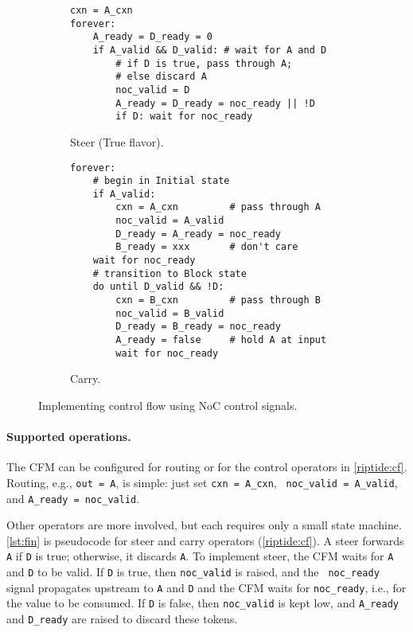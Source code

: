 \begin{figure}[t]
\begin{subfigure}{\linewidth}
\begin{lstlisting}[style=custompython]
cxn = A_cxn
forever:
    A_ready = D_ready = 0
    if A_valid && D_valid: # wait for A and D
        # if D is true, pass through A;
        # else discard A 
        noc_valid = D
        A_ready = D_ready = noc_ready || !D
        if D: wait for noc_ready
\end{lstlisting}
\caption{Steer (True flavor).}
\label{lst:fin:steer}
\end{subfigure}

\begin{subfigure}{\linewidth}
\begin{lstlisting}[style=custompython]
forever:
    # begin in Initial state
    if A_valid:
        cxn = A_cxn         # pass through A
        noc_valid = A_valid
        D_ready = A_ready = noc_ready
        B_ready = xxx       # don't care
    wait for noc_ready
    # transition to Block state
    do until D_valid && !D:
        cxn = B_cxn         # pass through B
        noc_valid = B_valid
        D_ready = B_ready = noc_ready
        A_ready = false     # hold A at input
        wait for noc_ready
\end{lstlisting}
\caption{Carry.}
\label{lst:fin:carry}
\end{subfigure}
  \caption{Implementing control flow using NoC control signals.}
  \label{lst:fin}
\end{figure}

\paragraph{Supported operations.}
The CFM can be configured for routing or for the control operators in
\autoref{riptide:cf}.
%
Routing, e.g., {\tt out = A}, is simple: just set {\tt cxn = A\_cxn}, {\tt
noc\_valid = A\_valid}, and {\tt A\_ready = noc\_valid}.

Other operators are more involved, but each requires only a
small state machine.
%
\autoref{lst:fin} is pseudocode for steer and carry operators
(\autoref{riptide:cf}).
%
A steer forwards {\tt A} if {\tt D} is true; otherwise,
it discards {\tt A}.
%
To implement steer, the CFM waits for {\tt A} and {\tt D}
to be valid.
%
If {\tt D} is true, then {\tt noc\_valid} is raised, and the {\tt
  noc\_ready} signal propagates upstream to {\tt A} and {\tt D}
and the CFM waits for {\tt noc\_ready}, i.e., for the value to be consumed.
%
If {\tt D} is false, then {\tt noc\_valid} is kept low, and
{\tt A\_ready} and {\tt D\_ready} are raised to discard these
tokens.

